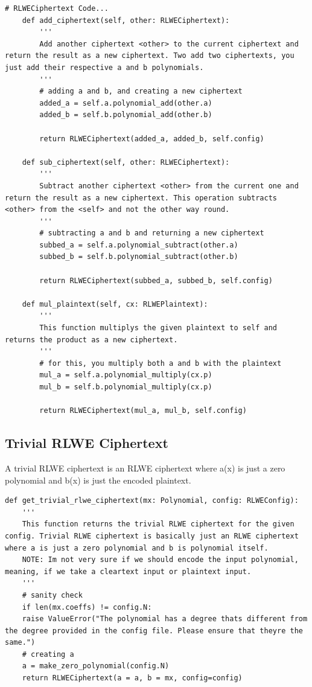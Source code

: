 \documentclass{report}
\begin{document}
\begin{verbatim}
# RLWECiphertext Code...
	def add_ciphertext(self, other: RLWECiphertext):
		'''
		Add another ciphertext <other> to the current ciphertext and return the result as a new ciphertext. Two add two ciphertexts, you just add their respective a and b polynomials.
		'''
		# adding a and b, and creating a new ciphertext
		added_a = self.a.polynomial_add(other.a)
		added_b = self.b.polynomial_add(other.b)
		
		return RLWECiphertext(added_a, added_b, self.config)
		
	def sub_ciphertext(self, other: RLWECiphertext):
		'''
		Subtract another ciphertext <other> from the current one and return the result as a new ciphertext. This operation subtracts <other> from the <self> and not the other way round.
		'''
		# subtracting a and b and returning a new ciphertext
		subbed_a = self.a.polynomial_subtract(other.a)
		subbed_b = self.b.polynomial_subtract(other.b)
		
		return RLWECiphertext(subbed_a, subbed_b, self.config)
	
	def mul_plaintext(self, cx: RLWEPlaintext):
		'''
		This function multiplys the given plaintext to self and returns the product as a new ciphertext.
		'''
		# for this, you multiply both a and b with the plaintext
		mul_a = self.a.polynomial_multiply(cx.p)
		mul_b = self.b.polynomial_multiply(cx.p)
		
		return RLWECiphertext(mul_a, mul_b, self.config)
\end{verbatim}
		
	\subsection{Trivial RLWE Ciphertext}
	A trivial RLWE ciphertext is an RLWE ciphertext where a(x) is just a zero polynomial and b(x) is just the encoded plaintext.
\begin{verbatim}
def get_trivial_rlwe_ciphertext(mx: Polynomial, config: RLWEConfig):
	'''
	This function returns the trivial RLWE ciphertext for the given config. Trivial RLWE ciphertext is basically just an RLWE ciphertext where a is just a zero polynomial and b is polynomial itself.
	NOTE: Im not very sure if we should encode the input polynomial, meaning, if we take a cleartext input or plaintext input.
	'''
	# sanity check
	if len(mx.coeffs) != config.N:
	raise ValueError("The polynomial has a degree thats different from the degree provided in the config file. Please ensure that theyre the same.")
	# creating a
	a = make_zero_polynomial(config.N)
	return RLWECiphertext(a = a, b = mx, config=config)
\end{verbatim}
\end{document}
